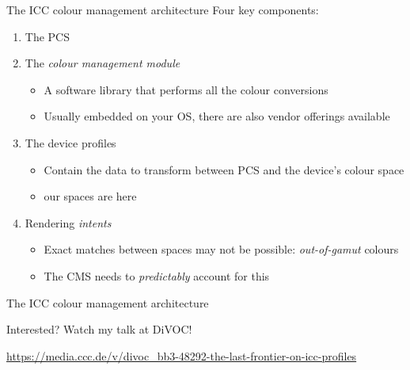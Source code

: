 \documentclass[aspectratio=169,usepdftitle=false]{fireshonks}
\begin{document}
\begin{frame}{The ICC colour management architecture}
    Four key components:
    \begin{enumerate}[<+(1)->]
        \item The PCS
        \item The \emph{colour management module}
              \begin{itemize}
                  \item A software library that performs all the colour conversions
                  \item Usually embedded on your OS, there are also vendor offerings available
              \end{itemize}
        \item The device profiles
              \begin{itemize}
                  \item Contain the data to transform between PCS and the device's colour space
                  \item {} our spaces are here
              \end{itemize}
        \item Rendering \emph{intents}
              \begin{itemize}
                  \item Exact matches between spaces may not be possible: \emph{out-of-gamut} colours
                  \item The CMS needs to \emph{predictably} account for this
              \end{itemize}
    \end{enumerate}
\end{frame}
\begin{frame}{The ICC colour management architecture}
    \begin{center}
        Interested? Watch my talk at DiVOC!


        \url{https://media.ccc.de/v/divoc_bb3-48292-the-last-frontier-on-icc-profiles}
    \end{center}
\end{frame}
\end{document}
